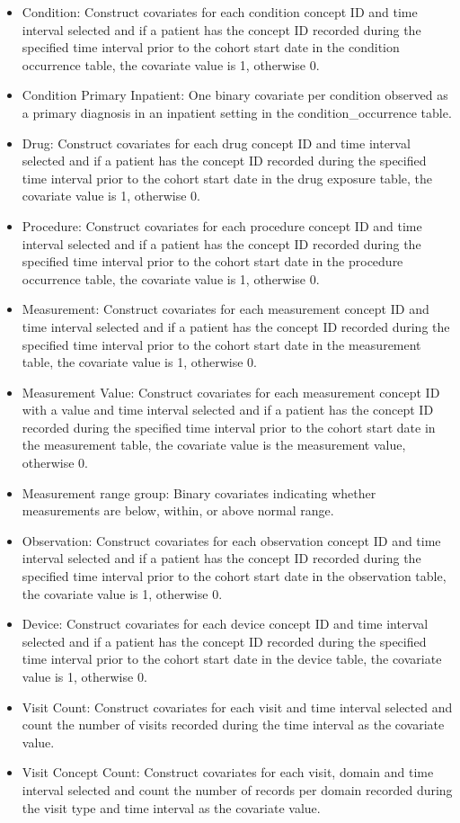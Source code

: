 \documentclass[11pt]{book}
\providecommand{\tightlist}{%
  \setlength{\itemsep}{0pt}\setlength{\parskip}{0pt}}
\theoremstyle{definition}
\theoremstyle{definition}
\theoremstyle{definition}
\theoremstyle{remark}
\begin{document}
\begin{itemize}
\tightlist
\item
  Condition: Construct covariates for each condition concept ID and time interval selected and if a patient has the concept ID recorded during the specified time interval prior to the cohort start date in the condition occurrence table, the covariate value is 1, otherwise 0.
\item
  Condition Primary Inpatient: One binary covariate per condition observed as a primary diagnosis in an inpatient setting in the condition\_occurrence table.
\item
  Drug: Construct covariates for each drug concept ID and time interval selected and if a patient has the concept ID recorded during the specified time interval prior to the cohort start date in the drug exposure table, the covariate value is 1, otherwise 0.
\item
  Procedure: Construct covariates for each procedure concept ID and time interval selected and if a patient has the concept ID recorded during the specified time interval prior to the cohort start date in the procedure occurrence table, the covariate value is 1, otherwise 0.
\item
  Measurement: Construct covariates for each measurement concept ID and time interval selected and if a patient has the concept ID recorded during the specified time interval prior to the cohort start date in the measurement table, the covariate value is 1, otherwise 0.
\item
  Measurement Value: Construct covariates for each measurement concept ID with a value and time interval selected and if a patient has the concept ID recorded during the specified time interval prior to the cohort start date in the measurement table, the covariate value is the measurement value, otherwise 0.
\item
  Measurement range group: Binary covariates indicating whether measurements are below, within, or above normal range.
\item
  Observation: Construct covariates for each observation concept ID and time interval selected and if a patient has the concept ID recorded during the specified time interval prior to the cohort start date in the observation table, the covariate value is 1, otherwise 0.
\item
  Device: Construct covariates for each device concept ID and time interval selected and if a patient has the concept ID recorded during the specified time interval prior to the cohort start date in the device table, the covariate value is 1, otherwise 0.
\item
  Visit Count: Construct covariates for each visit and time interval selected and count the number of visits recorded during the time interval as the covariate value.
\item
  Visit Concept Count: Construct covariates for each visit, domain and time interval selected and count the number of records per domain recorded during the visit type and time interval as the covariate value.
\end{itemize}
\end{document}
